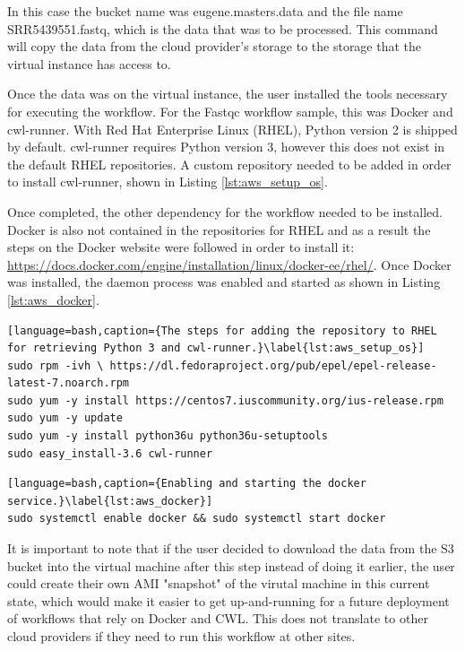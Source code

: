 In this case the bucket name was eugene.masters.data and the file name SRR5439551.fastq, which is the data that was to be processed. This command will copy the data from the cloud provider's storage to the storage that the virtual instance has access to.

Once the data was on the virtual instance, the user installed the tools necessary for executing the workflow. For the Fastqc workflow sample, this was Docker and cwl-runner. With Red Hat Enterprise Linux (RHEL), Python version 2 is shipped by default. cwl-runner requires Python version 3, however this does not exist in the default RHEL repositories. A custom repository needed to be added in order to install cwl-runner, shown in Listing \ref{lst:aws_setup_os}.

Once completed, the other dependency for the workflow needed to be installed. Docker is also not contained in the repositories for RHEL and as a result the steps on the Docker website were followed in order to install it: \url{https://docs.docker.com/engine/installation/linux/docker-ee/rhel/}. Once Docker was installed, the daemon process was enabled and started as shown in Listing \ref{lst:aws_docker}.

\begin{minipage}{\linewidth}
\begin{lstlisting}[language=bash,caption={The steps for adding the repository to RHEL for retrieving Python 3 and cwl-runner.}\label{lst:aws_setup_os}]
sudo rpm -ivh \ https://dl.fedoraproject.org/pub/epel/epel-release-latest-7.noarch.rpm
sudo yum -y install https://centos7.iuscommunity.org/ius-release.rpm
sudo yum -y update
sudo yum -y install python36u python36u-setuptools
sudo easy_install-3.6 cwl-runner
\end{lstlisting}
\end{minipage}

\begin{lstlisting}[language=bash,caption={Enabling and starting the docker service.}\label{lst:aws_docker}]
sudo systemctl enable docker && sudo systemctl start docker
\end{lstlisting}

It is important to note that if the user decided to download the data from the S3 bucket into the virtual machine after this step instead of doing it earlier, the user could create their own AMI "snapshot" of the virutal machine in this current state, which would make it easier to get up-and-running for a future deployment of workflows that rely on Docker and CWL. This does not translate to other cloud providers if they need to run this workflow at other sites.


